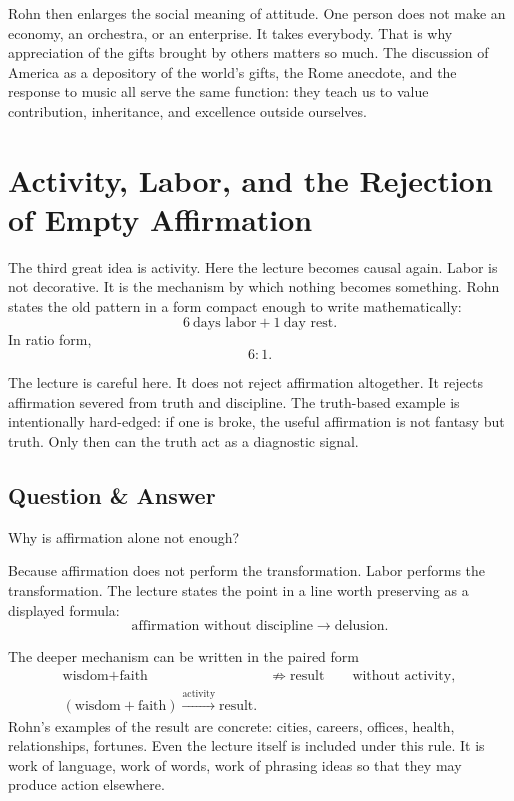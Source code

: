 Rohn then enlarges the social meaning of attitude. One person does not make an economy, an orchestra, or an enterprise. It takes everybody. That is why appreciation of the gifts brought by others matters so much. The discussion of America as a depository of the world's gifts, the Rome anecdote, and the response to music all serve the same function: they teach us to value contribution, inheritance, and excellence outside ourselves.

\section{Activity, Labor, and the Rejection of Empty Affirmation}

The third great idea is activity. Here the lecture becomes causal again. Labor is not decorative. It is the mechanism by which nothing becomes something. Rohn states the old pattern in a form compact enough to write mathematically:
\begin{equation}
6\ \text{days labor} + 1\ \text{day rest}.
\end{equation}
In ratio form,
\begin{equation}
6:1.
\end{equation}

The lecture is careful here. It does not reject affirmation altogether. It rejects affirmation severed from truth and discipline. The truth-based example is intentionally hard-edged: if one is broke, the useful affirmation is not fantasy but truth. Only then can the truth act as a diagnostic signal.

\subsection{Question \& Answer}

Why is affirmation alone not enough?

Because affirmation does not perform the transformation. Labor performs the transformation. The lecture states the point in a line worth preserving as a displayed formula:
\begin{equation}
\text{affirmation without discipline} \to \text{delusion}.
\end{equation}

The deeper mechanism can be written in the paired form
\begin{align}
\text{wisdom}+\text{faith} &\not\Rightarrow \text{result} \qquad \text{without activity},\\
(\text{wisdom}+\text{faith}) \xrightarrow{\text{activity}} \text{result}.
\end{align}
Rohn's examples of the result are concrete: cities, careers, offices, health, relationships, fortunes. Even the lecture itself is included under this rule. It is work of language, work of words, work of phrasing ideas so that they may produce action elsewhere.

